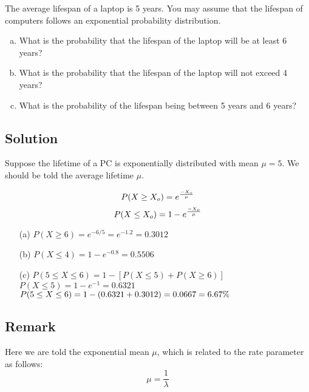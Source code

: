 \documentclass[a4paper,12pt]{article}
\begin{document}
The average lifespan of a laptop is 5 years. You may assume that
the lifespan of computers follows an exponential probability
distribution. 
\begin{enumerate}[(a)]
\item  What is the
probability that the lifespan of the laptop will be at least 6
years? \item 

What is the probability that the lifespan of the laptop will not
exceed 4 years? \item  What is the probability of the
lifespan being between 5 years and 6 years?
\end{enumerate}
\subsection*{Solution}
Suppose the lifetime of a PC is exponentially distributed with
mean $\mu =5$. We should be told the average lifetime $\mu$.

\[
P( X \geq X_o) = e^{{-X_o \over \mu}}
\]
\[
P( X \leq X_o) = 1 - e^{{-X_o \over \mu}}
\]

\begin{itemize}
\item[(a)] $P(X \geq 6) = e^{-6/5} =  e^{-1.2} = 0.3012$
\item[(b)] $P(X \leq 4) =  1 - e^{-0.8} = 0.5506$
\item[(c)] $P(5 \leq X \leq 6) = 1- [ P( X \leq 5) +  P( X \geq 6)]$ \\ \smallskip
$ P( X \leq 5) = 1 - e^{-1} = 0.6321$\\ \smallskip
$P(5 \leq X \leq 6) = 1 - (0.6321 + 0.3012) \\ = 0.0667\\= 6.67 \%$
\end{itemize}	

\subsection*{Remark}

Here we are told the exponential mean $\mu$, which is related to the rate parameter as follows:
\[ \mu = \frac{1}{\lambda}\]
\end{document}
